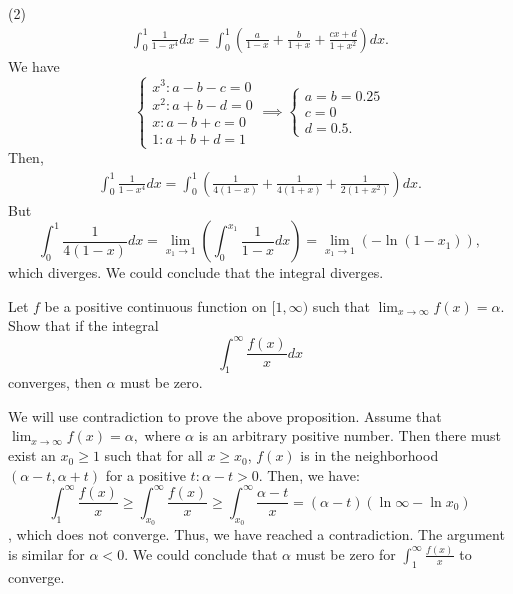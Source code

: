 \begin{numedquestion}
    (2)
    \begin{align*}
        \int_{0}^{1} \frac{1}{1-x^{4}} d x = \int_0^1 \left(\frac{a}{1-x} + \frac{b}{1+x} + \frac{cx + d}{1+x^{2}}\right) d x.
    \end{align*} 
    We have 
    \[
        \begin{cases}
            x^3: a - b - c = 0 \\
            x^2: a + b - d = 0 \\
            x: a - b + c = 0 \\
            1: a + b + d = 1
        \end{cases}
        \implies  
        \begin{cases}
            a = b = 0.25\\
            c = 0 \\
            d = 0.5.    
        \end{cases}
    \]
    Then, 
    \begin{align*}
        \int_{0}^{1} \frac{1}{1-x^{4}} d x = \int_0^1 \left( \frac{1}{4(1-x)} + \frac{1}{4(1+x)} + \frac{1}{2(1+x^{2})} \right) d x.
    \end{align*} 
    But \[
        \int_0^1 \frac{1}{4(1-x)} d x = \lim_{x_1 \rightarrow 1} \left(\int_0^{x_1} \frac{1}{1-x} d x\right) = \lim_{x_1 \rightarrow 1} (-\ln (1-x_1)),
    \]
    which diverges.
    We could conclude that the integral diverges. 

    
\end{numedquestion} 

\begin{numedquestion}
    \begin{prop}
        Let \(f\) be a positive continuous function on \([1, \infty)\) such that \(\lim _{x \rightarrow \infty} f(x)=\alpha .\) Show that if the integral
        \[
        \int_{1}^{\infty} \frac{f(x)}{x} d x
        \]
        converges, then \(\alpha\) must be zero. 
    \end{prop} 
    We will use contradiction to prove the above proposition. Assume that \(\lim _{x \rightarrow \infty} f(x)=\alpha,\) where $\alpha$ is an arbitrary positive number. Then there must exist an $x_0 \geq 1$ such that for all $x \geq x_0$, $f(x)$ is in the neighborhood $(\alpha - t, \alpha +t)$ for a positive $t: \alpha - t  > 0$. Then, we have:
    \[
        \int_1^\infty \frac{f(x)}{x} \geq \int_{x_0}^{\infty} \frac{f(x)}{x}  \geq \int_{x_0}^{\infty} \frac{\alpha -t}{x} = (\alpha -t)(\ln \infty - \ln x_0)
    \], which does not converge. Thus, we have reached a contradiction. The argument is similar for $\alpha < 0$. We could conclude that $\alpha$ must be zero for $\int_1^\infty \frac{f(x)}{x}$ to converge. 
\end{numedquestion}  

